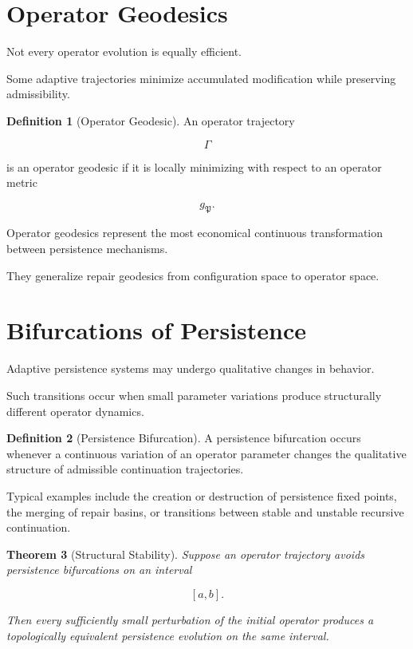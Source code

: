 \documentclass[11pt]{book}
\numberwithin{equation}{chapter}
\theoremstyle{definition}
\newtheorem{definition}{Definition}[chapter]
\theoremstyle{plain}
\newtheorem{theorem}[definition]{Theorem}
\begin{document}
\section{Operator Geodesics}

Not every operator evolution is equally efficient.

Some adaptive trajectories minimize accumulated modification while
preserving admissibility.

\begin{definition}[Operator Geodesic]

An operator trajectory

\[
\Gamma
\]

is an operator geodesic if it is locally minimizing with respect to an
operator metric

\[
g_{\mathfrak P}.
\]

\end{definition}

Operator geodesics represent the most economical continuous
transformation between persistence mechanisms.

They generalize repair geodesics from configuration space to operator
space.

\section{Bifurcations of Persistence}

Adaptive persistence systems may undergo qualitative changes in
behavior.

Such transitions occur when small parameter variations produce
structurally different operator dynamics.

\begin{definition}[Persistence Bifurcation]

A persistence bifurcation occurs whenever a continuous variation of an
operator parameter changes the qualitative structure of admissible
continuation trajectories.

\end{definition}

Typical examples include the creation or destruction of persistence
fixed points, the merging of repair basins, or transitions between
stable and unstable recursive continuation.

\begin{theorem}[Structural Stability]

Suppose an operator trajectory avoids persistence bifurcations on an
interval

\[
[a,b].
\]

Then every sufficiently small perturbation of the initial operator
produces a topologically equivalent persistence evolution on the same
interval.

\end{theorem}
\end{document}

